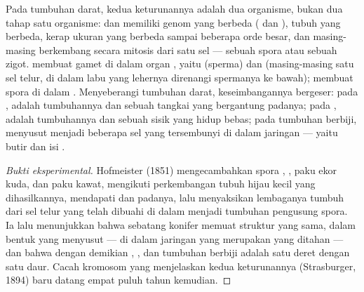 \begin{proposition}\label{prop:b2:plant-life-cycles:alternation}
Pada tumbuhan darat, kedua keturunannya adalah dua organisme, bukan dua
tahap satu organisme:  dan  memiliki genom yang
berbeda ( dan ), tubuh yang berbeda, kerap ukuran yang
berbeda sampai beberapa orde besar, dan masing-masing berkembang
secara mitosis dari satu sel --- sebuah spora atau sebuah zigot.
 membuat gamet di dalam organ , yaitu
\emph{} (sperma) dan \emph{} (masing-masing satu
sel telur, di dalam labu yang lehernya direnangi spermanya ke bawah);
 membuat spora di dalam \emph{}. Menyeberangi
tumbuhan darat, keseimbangannya bergeser: pada , 
adalah tumbuhannya dan  sebuah tangkai yang bergantung
padanya; pada ,  adalah tumbuhannya dan
 sebuah sisik yang hidup bebas; pada tumbuhan berbiji,
 menyusut menjadi beberapa sel yang tersembunyi di dalam
jaringan  --- yaitu butir  dan isi .
\end{proposition}
\begin{proof}[Bukti eksperimental]
Hofmeister (1851) mengecambahkan spora , , paku ekor
kuda, dan paku kawat, mengikuti perkembangan tubuh hijau kecil yang
dihasilkannya, mendapati  dan  padanya, lalu
menyaksikan lembaganya tumbuh dari sel telur yang telah dibuahi di
dalam  menjadi tumbuhan pengusung spora. Ia lalu
menunjukkan bahwa  sebatang konifer memuat struktur yang
sama, dalam bentuk yang menyusut ---  di dalam jaringan yang
merupakan  yang ditahan --- dan bahwa dengan demikian ,
, dan tumbuhan berbiji adalah satu deret dengan satu daur.
Cacah kromosom yang menjelaskan kedua keturunannya (Strasburger, 1894)
baru datang empat puluh tahun kemudian.
\end{proof}

